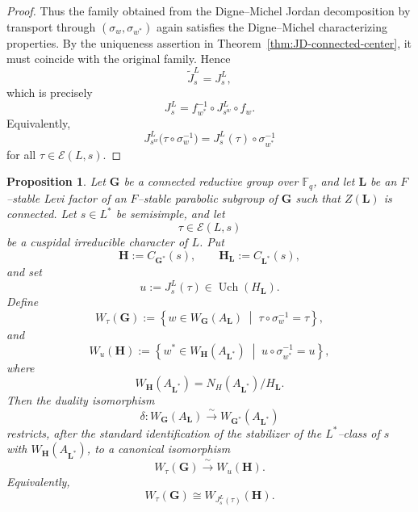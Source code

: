 \documentclass{amsart}
\theoremstyle{plain}
\numberwithin{equation}{section}
\newtheorem{proposition}[theorem]{Proposition}
\theoremstyle{definition}
\newcommand{\Uch}{\operatorname{Uch}}
\newcommand{\bG}{\mathbf{G}}
\newcommand{\bL}{\mathbf{L}}
\newcommand{\bH}{\mathbf{H}}
\begin{document}
\begin{proof}
Thus the family obtained from the Digne--Michel Jordan decomposition by
transport through $(\sigma_w,\sigma_{w^*})$ again satisfies the
Digne--Michel characterizing properties.  By the uniqueness assertion in
Theorem~\ref{thm:JD-connected-center}, it must coincide with the
original family.  Hence
\[
\widetilde J_s^L=J_s^L,
\]
which is precisely
\[
J_s^L
=
f_{w^*}^{-1}\circ J_{s^w}^{L}\circ f_w .
\]
Equivalently,
\[
J_{s^w}^{L}\bigl(\tau\circ\sigma_w^{-1}\bigr)
=
J_s^L(\tau)\circ\sigma_{w^*}^{-1}
\]
for all $\tau\in\mathcal{E}(L,s)$.
\end{proof}

\begin{proposition}\label{prop:weyl-isom-connected-levi-center}
Let $\bG$ be a connected reductive group over $\mathbb F_q$, and let
$\bL$ be an $F$--stable Levi factor of an $F$--stable parabolic subgroup of
$\bG$ such that $Z(\bL)$ is connected.  Let $s\in L^*$ be semisimple, and let
\[
\tau\in \mathcal E(L,s)
\]
be a cuspidal irreducible character of $L$.  Put
\[
\bH:=C_{\bG^*}(s),\qquad
\bH_{\bL}:=C_{\bL^*}(s),
\]
and set
\[
u:=J_s^L(\tau)\in \Uch(H_{\bL}).
\]
Define
\[
W_\tau(\bG)
:=
\left\{
w\in W_{\bG}(A_{\bL})
\;\middle|\;
\tau\circ \sigma_w^{-1}=\tau
\right\},
\]
and
\[
W_u(\bH)
:=
\left\{
w^*\in W_{\bH}(A_{\bL^*})
\;\middle|\;
u\circ \sigma_{w^*}^{-1}=u
\right\},
\]
where
\[
W_{\bH}(A_{\bL^*})
=
N_H(A_{\bL^*})/H_{\bL}.
\]
Then the duality isomorphism
\[
\delta:W_{\bG}(A_{\bL})\xrightarrow{\sim} W_{\bG^*}(A_{\bL^*})
\]
restricts, after the standard identification of the stabilizer of the
$L^*$--class of $s$ with $W_{\bH}(A_{\bL^*})$, to a canonical isomorphism
\[
W_\tau(\bG)
\xrightarrow{\;\sim\;}
W_u(\bH).
\]
Equivalently,
\[
W_\tau(\bG)
\cong
W_{J_s^L(\tau)}(\bH).
\]
\end{proposition}
\end{document}

